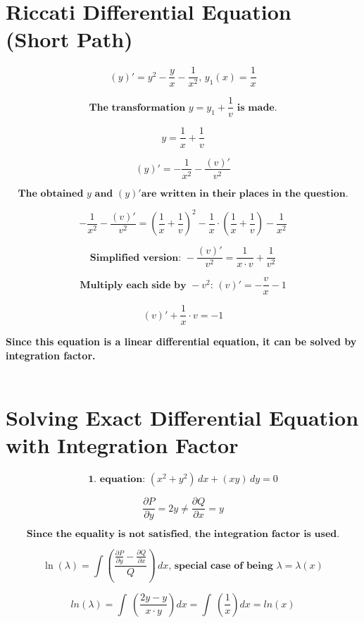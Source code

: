 \documentclass{article}
\begin{document}
\section{Riccati Differential Equation (Short Path)}
    \[
    (y)' = y^2 - \frac{y}{x} - \frac{1}{x^2} \textbf{, } y_1(x) = \frac{1}{x}
    \]
    
    \[
    \textbf{The transformation } y = y_1 + \frac{1}{v} \textbf{ is made.}
    \]
    
    \[
    y = \frac{1}{x} + \frac{1}{v}
    \]
    
    \[
    (y)' = -\frac{1}{x^2} - \frac{(v)'}{v^2}
    \]
    
    \[
    \textbf{The obtained } y \textbf{ and } (y)' \textbf{are written in their places in the question.}
    \]
    
    \[
    -\frac{1}{x^2} - \frac{(v)'}{v^2} = \left(\frac{1}{x} + \frac{1}{v}\right)^2 - \frac{1}{x} \cdot \left(\frac{1}{x} + \frac{1}{v}\right) - \frac{1}{x^2}
    \]
    
    \[
    \textbf{Simplified version: } -\frac{(v)'}{v^2} = \frac{1}{x \cdot v} + \frac{1}{v^2}
    \]
    
    \[
    \textbf{Multiply each side by } -v^2 \textbf{: } (v)' = -\frac{v}{x} - 1
    \]
    
    \[
    (v)' + \frac{1}{x} \cdot v = -1
    \]
    
    \textbf{Since this equation is a linear differential equation, it can be solved by integration factor.}
\\~\\

\section{Solving Exact Differential Equation with Integration Factor}
    \[
    \textbf{1. equation: } (x^2 + y^2) \, dx + (xy) \, dy = 0
    \]
    
    \[
    \frac{\partial P}{\partial y} = 2y \neq \frac{\partial Q}{\partial x} = y
    \]
    
    \[
    \textbf{Since the equality is not satisfied, the integration factor is used.}
    \]
    
    \[
    \ln(\lambda) = \int \left(\frac{\frac{\partial P}{\partial y} - \frac{\partial Q}{\partial x}}{Q}\right) \, dx \textbf{, special case of being } \lambda = \lambda \left(x\right)
    \]
    
    \[
    ln\left(\lambda \right)=\int \:\left(\frac{2y-y}{x\cdot y}\right)dx=\int \:\left(\frac{1}{x}\right)dx=ln\left(x\right)
    \]
    
\end{document}
